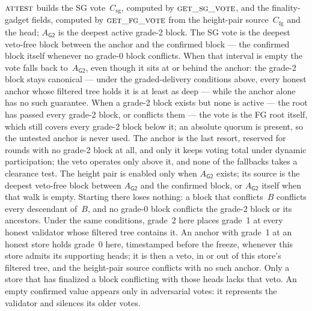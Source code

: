 \documentclass{article}
\theoremstyle{plain}
\theoremstyle{definition}
\theoremstyle{remark}
\newcommand{\Gtwo}{\mathsf{G2}}
\newcommand{\Csg}{C_{\mathrm{sg}}}
\newcommand{\Cfg}{C_{\mathrm{fg}}}
\newcommand{\Agtwo}{A_{\Gtwo}}
\begin{document}
$\Call{attest}{}$ builds the SG vote~$\Csg$, computed by
$\Call{get\_sg\_vote}{}$, and the finality-gadget fields, computed by
$\Call{get\_fg\_vote}{}$ from the height-pair source~$\Cfg$ and the
head; $\Agtwo$ is the deepest active grade-2 block.  The SG vote is the deepest
veto-free block between the anchor and the confirmed block --- the
confirmed block itself whenever no grade-0 block conflicts.  When that
interval is empty the vote falls back to~$\Agtwo$, even though
it sits at or behind the anchor: the grade-2 block stays canonical ---
under the graded-delivery conditions above, every honest anchor whose
filtered tree holds it is at least as
deep --- while the anchor alone has no such guarantee.  When a grade-2
block exists but none is active --- the root has passed every grade-2
block, or conflicts them --- the vote is the FG root itself, which still
covers every grade-2 block below it; an absolute quorum is present, so
the untested anchor is never used.  The anchor is the last resort,
reserved for rounds with no grade-2 block at all, and only it keeps
voting total under dynamic participation; the veto operates only above
it, and none of the fallbacks takes a clearance test.  The height pair is enabled only when
$\Agtwo$ exists; its source is the deepest veto-free block between
$\Agtwo$ and the confirmed block, or $\Agtwo$ itself when that
walk is empty.  Starting there loses nothing: a block that
conflicts~$B$ conflicts every descendant of~$B$, and no grade-0 block
conflicts the grade-2 block or its ancestors.  Under the same conditions,
grade~2 here places grade~1 at every honest validator whose filtered tree
contains it.  An
anchor with grade~1 at an honest store holds grade~0 here, timestamped
before the freeze, whenever this store admits its supporting heads; it is
then a veto, in or out of this store's filtered tree, and the height-pair
source conflicts with no such anchor.  Only a store that has finalized a
block conflicting with those heads lacks that veto.  An empty confirmed value appears only
in adversarial votes: it represents the validator and silences its older
votes.
\end{document}
